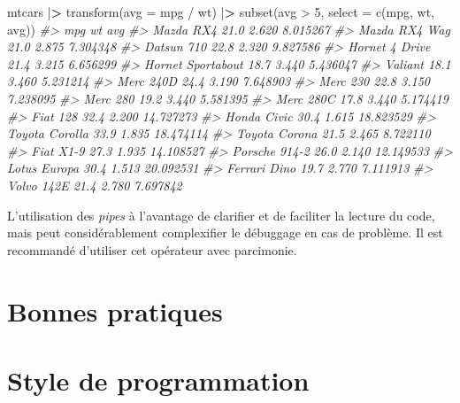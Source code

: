 \documentclass[
  french,
]{scrbook}
\newenvironment{Shaded}{\begin{snugshade}}{\end{snugshade}}
\newcommand{\AttributeTok}[1]{\textcolor[rgb]{0.77,0.63,0.00}{#1}}
\newcommand{\CommentTok}[1]{\textcolor[rgb]{0.56,0.35,0.01}{\textit{#1}}}
\newcommand{\DecValTok}[1]{\textcolor[rgb]{0.00,0.00,0.81}{#1}}
\newcommand{\ErrorTok}[1]{\textcolor[rgb]{0.64,0.00,0.00}{\textbf{#1}}}
\newcommand{\FunctionTok}[1]{\textcolor[rgb]{0.00,0.00,0.00}{#1}}
\newcommand{\NormalTok}[1]{#1}
\newcommand{\SpecialCharTok}[1]{\textcolor[rgb]{0.00,0.00,0.00}{#1}}
\begin{document}
\begin{Shaded}
\begin{Highlighting}[]
\NormalTok{mtcars }\SpecialCharTok{|}\ErrorTok{\textgreater{}} 
  \FunctionTok{transform}\NormalTok{(}\AttributeTok{avg =}\NormalTok{ mpg }\SpecialCharTok{/}\NormalTok{ wt) }\SpecialCharTok{|}\ErrorTok{\textgreater{}} 
  \FunctionTok{subset}\NormalTok{(avg }\SpecialCharTok{\textgreater{}} \DecValTok{5}\NormalTok{, }\AttributeTok{select =} \FunctionTok{c}\NormalTok{(mpg, wt, avg))}
\CommentTok{\#\textgreater{}                    mpg    wt       avg}
\CommentTok{\#\textgreater{} Mazda RX4         21.0 2.620  8.015267}
\CommentTok{\#\textgreater{} Mazda RX4 Wag     21.0 2.875  7.304348}
\CommentTok{\#\textgreater{} Datsun 710        22.8 2.320  9.827586}
\CommentTok{\#\textgreater{} Hornet 4 Drive    21.4 3.215  6.656299}
\CommentTok{\#\textgreater{} Hornet Sportabout 18.7 3.440  5.436047}
\CommentTok{\#\textgreater{} Valiant           18.1 3.460  5.231214}
\CommentTok{\#\textgreater{} Merc 240D         24.4 3.190  7.648903}
\CommentTok{\#\textgreater{} Merc 230          22.8 3.150  7.238095}
\CommentTok{\#\textgreater{} Merc 280          19.2 3.440  5.581395}
\CommentTok{\#\textgreater{} Merc 280C         17.8 3.440  5.174419}
\CommentTok{\#\textgreater{} Fiat 128          32.4 2.200 14.727273}
\CommentTok{\#\textgreater{} Honda Civic       30.4 1.615 18.823529}
\CommentTok{\#\textgreater{} Toyota Corolla    33.9 1.835 18.474114}
\CommentTok{\#\textgreater{} Toyota Corona     21.5 2.465  8.722110}
\CommentTok{\#\textgreater{} Fiat X1{-}9         27.3 1.935 14.108527}
\CommentTok{\#\textgreater{} Porsche 914{-}2     26.0 2.140 12.149533}
\CommentTok{\#\textgreater{} Lotus Europa      30.4 1.513 20.092531}
\CommentTok{\#\textgreater{} Ferrari Dino      19.7 2.770  7.111913}
\CommentTok{\#\textgreater{} Volvo 142E        21.4 2.780  7.697842}
\end{Highlighting}
\end{Shaded}

L'utilisation des \emph{pipes} à l'avantage de clarifier et de faciliter la lecture du code, mais peut considérablement complexifier le débuggage en cas de problème. Il est recommandé d'utiliser cet opérateur avec parcimonie.

\hypertarget{bonnes-pratiques}{%
\chapter{Bonnes pratiques}\label{bonnes-pratiques}}

\hypertarget{style}{%
\chapter{Style de programmation}\label{style}}
\end{document}
